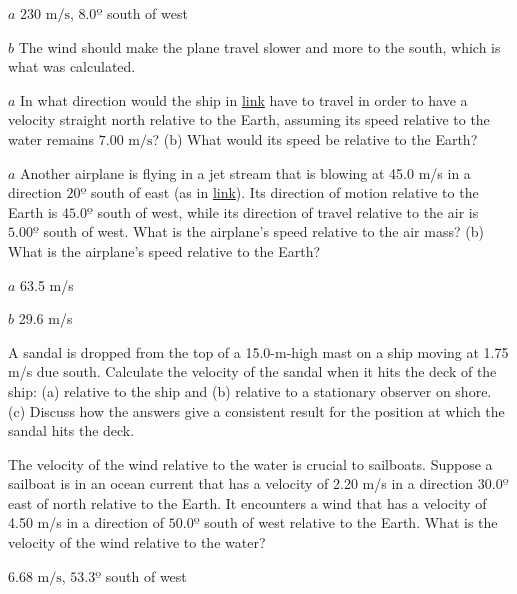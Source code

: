 \documentclass[
]{book}
\begin{document}
\leavevmode{}%
\(a\) \({2\text{30\ m/s}}{}\), \(8.0º{}\) south of west

\(b\) The wind should make the plane travel slower and more to the
south, which is what was calculated.

\hypertarget{fs-id1845552}{}
\leavevmode{}%
\(a\) In what direction would the ship in
\protect\hyperlink{fs-id1545568}{link} have to travel in order to
have a velocity straight north relative to the Earth, assuming its speed
relative to the water remains \({7\text{.}\text{00\ m/s}}{}\)? (b) What
would its speed be relative to the Earth?

\hypertarget{fs-id1545174}{}
\leavevmode{}%
\(a\) Another airplane is flying in a jet stream that is blowing at 45.0
m/s in a direction \(\text{20º}{}\) south of east (as in
\protect\hyperlink{eip-741}{link}). Its direction of motion
relative to the Earth is \(45.0º{}\) south of west, while its direction of
travel relative to the air is \(5.00º{}\) south of west. What is the
airplane's speed relative to the air mass? (b) What is the airplane's
speed relative to the Earth?

\leavevmode{}%
\(a\) 63.5 m/s

\(b\) 29.6 m/s

\hypertarget{fs-id2022863}{}
\leavevmode{}%
A sandal is dropped from the top of a 15.0-m-high mast on a ship moving
at 1.75 m/s due south. Calculate the velocity of the sandal when it hits
the deck of the ship: (a) relative to the ship and (b) relative to a
stationary observer on shore. (c) Discuss how the answers give a
consistent result for the position at which the sandal hits the deck.

\hypertarget{fs-id1924931}{}
\leavevmode{}%
The velocity of the wind relative to the water is crucial to sailboats.
Suppose a sailboat is in an ocean current that has a velocity of 2.20
m/s in a direction \(30.0º{}\) east of north relative to the Earth. It
encounters a wind that has a velocity of 4.50 m/s in a direction of
\(50.0º{}\) south of west relative to the Earth. What is the velocity of
the wind relative to the water?

\leavevmode{}%
\({6\text{.}\text{68\ m/s}}{}\), \({\text{53}\text{.}3º}{}\) south of west
\end{document}
